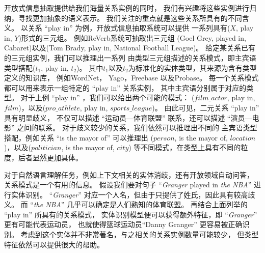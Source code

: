 开放式信息抽取提供给我们海量关系实例的同时，
我们有兴趣将这些实例进行归纳，寻找更加抽象的语义表示。
我们关注的重点就是这些关系所具有的不同含义。
以关系 ``play in'' 为例，开放式信息抽取系统可以提供
一系列具有($X$, play in, $Y$)形式的三元组。
例如ReVerb系统\cite{fader2011identifying}可抽取出三元组
(Goel Grey, played in, Cabaret)以及(Tom Brady, play in, National Football League)。
给定某关系已有的三元组实例，我们可以推理出一系列
由类型三元组描述的关系模式，即主宾语类型搭配($t_1$, play in, $t_2$)。
其中$t_1$以及$t_2$为标准化的实体类型，其来源为含有类型定义的知识库，
例如WordNet\cite{miller1995wordnet}，%
Yago\cite{suchanek2007WWW}，Freebase\cite{bollacker2008freebase}
以及Probase\cite{wu2012probase}。
每一个关系模式都可以用来表示一组特定的 ``play in'' 关系实例，
其中主宾语分别属于对应的类型。
对于上例 ``play in'' ，我们可以给出两个可能的模式：
($film\_actor$, play in, $film$)，以及($pro\_athlete$, play in, $sports\_league$)。
由此可见，二元关系 ``play in'' 具有明显歧义，
不仅可以描述 ``{运动员—体育联盟}'' 联系，还可以描述 ``{演员—电影}'' 之间的联系。
对于歧义较少的关系，我们依然可以推理出不同的
主宾语类型搭配，例如关系 ``is the mayor of'' 可以推理出
($person$, is the mayor of, $location$)，以及($politician$, is the mayor of, $city$)
等不同模式，在类型上具有不同的粒度，后者显然更加具体。

对于自然语言理解任务，例如上下文相关的实体消歧，还有开放领域自动问答，
关系模式是一个有用的信息。
假设我们要对句子 ``\textit{Granger} played in \textit{the NBA}'' 进行实体识别。
``\textit{Granger}'' 对应一个人名，但由于只提供了姓氏，因此具有较高歧义。
而 ``\textit{the NBA}'' 几乎可以确定是人们熟知的体育联盟。
再结合上面列举的 ``play in'' 所具有的关系模式，
实体识别模型便可以获得额外特征，即 ``\textit{Granger}'' 更有可能代表运动员，
也就使得篮球运动员``Danny Granger'' 更容易被正确识别。
考虑到这个实体并不非常著名，与之相关的关系实例数量可能较少，
但类型特征依然可以提供很大的帮助。

